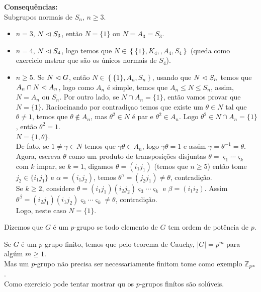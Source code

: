 \textbf{Consequências:}\\
Subgrupos normais de $S_n$, $n\geq 3$.
\begin{itemize}
  \item $n=3$, $N\vartriangleleft S_3$, então $N=\{1\}$ ou $N=A_3=S_3$.
  \item $n=4$, $N\vartriangleleft S_4$, logo temos que $N\in \left\{ \{1\},K_4,,A_4,S_4 \right\}$ (queda como exercicio mstrar que são os únicos normais de $S_4$).
  \item $n\geq 5$. Se $N\vartriangleleft G$, então $N\in\left\{ \{1\},A_n,S_n \right\}$, usando que $N\vartriangleleft S_n$ temos que $A_n\cap N\vartriangleleft A_n$, logo como $A_n$ é simple, temos que $A_n\leq N\leq S_n$, assim, $N=A_n$ ou $S_n$. Por outro lado, se $N\cap A_n=\{1\}$, então vamos provar que $N=\{1\}$. Raciocinando por contradiçao temos que existe um $\theta\in N$ tal que $\theta\neq 1$, temos que $\theta\notin A_n$, mas $\theta^{2}\in N$ é par e $\theta^{2}\in A_n$. Logo $\theta^{2}\in N\cap A_n=\{1\}$, então $\theta^{2}=1$.\\
     $N=\{1,\theta\}$.\\
    De fato, se $1\neq \gamma\in N$ temos que $\gamma\theta\in A_n$, logo $\gamma\theta=1$ e assim $\gamma=\theta^{-1}=\theta$.\\
    Agora, escreva $\theta$ como um produto de transposições disjuntas $\theta=\varsigma_1\cdots\varsigma_k$ com $k$ impar, se $k=1$, digamos $\theta=(i_1j_1)$ (temos que $n\geq 5$) então tome $j_2\in \{i_1j_1\}$ e $\alpha=(i_1j_2)$, temos $\theta^{\gamma}=(j_2j_1)\neq \theta$, contradição.\\
    Se $k\geq 2$, considere $\theta=(i_1j_1)(i_2j_2)\varsigma_3\cdots\varsigma_k$ e $\beta=(i_1i_2)$. Assim $\theta^{\beta}=(i_2j_1)(i_1j_2)\varsigma_3\cdots\varsigma_k\neq \theta$, contradição.\\
    Logo, neste caso $N=\{1\}$.
\end{itemize}
\begin{definition}[$p$-grupo]
  Dizemos que $G$ é um $p$-grupo se todo elemento de $G$ tem ordem de potência de $p$.
\end{definition}
\begin{note}
  Se $G$ é um $p$ grupo finito, temos que pelo teorema de Cauchy, $|G|=p^{m}$ para algúm $m\geq 1$.\\
  Mas um $p$-grupo não precisa ser necessariamente finitom tome como exemplo $\mathbb{Z}_{p^{\infty}}$.\\
  Como exercicio pode tentar mostrar qu os $p$-grupos finítos são solúveis.
\end{note}
